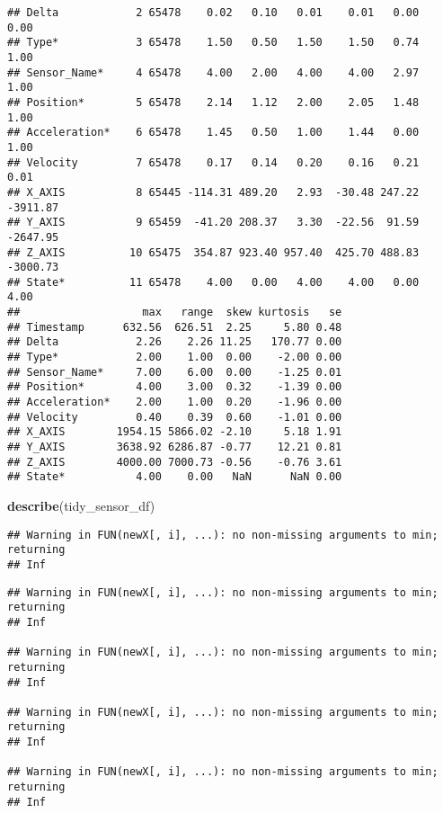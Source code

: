 \documentclass[]{article}
\newenvironment{Shaded}{\begin{snugshade}}{\end{snugshade}}
\newcommand{\KeywordTok}[1]{\textcolor[rgb]{0.13,0.29,0.53}{\textbf{#1}}}
\newcommand{\NormalTok}[1]{#1}
\begin{document}
\begin{verbatim}
## Delta            2 65478    0.02   0.10   0.01    0.01   0.00     0.00
## Type*            3 65478    1.50   0.50   1.50    1.50   0.74     1.00
## Sensor_Name*     4 65478    4.00   2.00   4.00    4.00   2.97     1.00
## Position*        5 65478    2.14   1.12   2.00    2.05   1.48     1.00
## Acceleration*    6 65478    1.45   0.50   1.00    1.44   0.00     1.00
## Velocity         7 65478    0.17   0.14   0.20    0.16   0.21     0.01
## X_AXIS           8 65445 -114.31 489.20   2.93  -30.48 247.22 -3911.87
## Y_AXIS           9 65459  -41.20 208.37   3.30  -22.56  91.59 -2647.95
## Z_AXIS          10 65475  354.87 923.40 957.40  425.70 488.83 -3000.73
## State*          11 65478    4.00   0.00   4.00    4.00   0.00     4.00
##                   max   range  skew kurtosis   se
## Timestamp      632.56  626.51  2.25     5.80 0.48
## Delta            2.26    2.26 11.25   170.77 0.00
## Type*            2.00    1.00  0.00    -2.00 0.00
## Sensor_Name*     7.00    6.00  0.00    -1.25 0.01
## Position*        4.00    3.00  0.32    -1.39 0.00
## Acceleration*    2.00    1.00  0.20    -1.96 0.00
## Velocity         0.40    0.39  0.60    -1.01 0.00
## X_AXIS        1954.15 5866.02 -2.10     5.18 1.91
## Y_AXIS        3638.92 6286.87 -0.77    12.21 0.81
## Z_AXIS        4000.00 7000.73 -0.56    -0.76 3.61
## State*           4.00    0.00   NaN      NaN 0.00
\end{verbatim}

\begin{Shaded}
\begin{Highlighting}[]
\KeywordTok{describe}\NormalTok{(tidy_sensor_df)}
\end{Highlighting}
\end{Shaded}

\begin{verbatim}
## Warning in FUN(newX[, i], ...): no non-missing arguments to min; returning
## Inf
\end{verbatim}

\begin{verbatim}
## Warning in FUN(newX[, i], ...): no non-missing arguments to min; returning
## Inf

## Warning in FUN(newX[, i], ...): no non-missing arguments to min; returning
## Inf

## Warning in FUN(newX[, i], ...): no non-missing arguments to min; returning
## Inf

## Warning in FUN(newX[, i], ...): no non-missing arguments to min; returning
## Inf
\end{verbatim}
\end{document}
